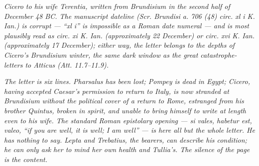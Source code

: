 
\textit{Cicero to his wife Terentia, written from
Brundisium in the second half of December 48 BC. The
manuscript dateline (\textit{Scr. Brundisi a. 706 (48)
circ. xl i K. Ian.}) is corrupt --- ``xl i'' is
impossible as a Roman date numeral --- and is most
plausibly read as \textit{circ. xi K. Ian.}
(approximately 22 December) or \textit{circ. xvi K. Ian.}
(approximately 17 December); either way, the letter
belongs to the depths of Cicero's Brundisium winter,
the same dark window as the great catastrophe-letters
to Atticus (\textit{Att.} 11.7--11.9).}

\textit{The letter is six lines. Pharsalus has been
lost; Pompey is dead in Egypt; Cicero, having accepted
Caesar's permission to return to Italy, is now stranded
at Brundisium without the political cover of a return
to Rome, estranged from his brother Quintus, broken in
spirit, and unable to bring himself to write at length
even to his wife. The standard Roman epistolary opening
--- \textit{si vales, habetur est, valeo}, ``if you are
well, it is well; I am well'' --- is here all but the
whole letter. He has nothing to say. Lepta and Trebatius,
the bearers, can describe his condition; he can only
ask her to mind her own health and Tullia's. The silence
of the page is the content.}
